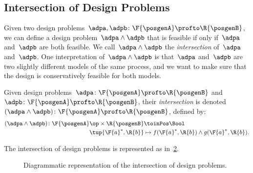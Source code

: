 %


\begin{figure}[h!]
  \centering
  \caption{\label{fig:dpcoproduct}}
\end{figure}

\subsection{Intersection of Design Problems}

Given two design problems~$\adpa, \adpb \colon \F{\posgenA} \profto \R{\posgenB}$, we can define a design problem~$\adpa \wedge \adpb$ that is feasible if only if~$\adpa$ and~$\adpb$ are both feasible.
We call~$\adpa \wedge \adpb$ the \emph{intersection} of~$\adpa$ and~$\adpb$.
One interpretation of~$\adpa \wedge \adpb$ is that~$\adpa$ and~$\adpb$ are two slightly different models of the same process, and we want to make sure that the design is conservatively feasible for both models.

\begin{definition}
  \label{def:intersection_dp}
  \label{def:dp-intersection}
  Given design problems~$\adpa\colon \F{\posgenA} \profto \R{\posgenB}$ and~$\adpb\colon \F{\posgenA} \profto \R{\posgenB}$,
  their \emph{intersection} is denoted~$(\adpa \wedge \adpb)\colon \F{\posgenA} \profto \R{\posgenB}$, defined by:
  \begin{equation}
    \begin{aligned}
    (\adpa \wedge \adpb)
      \colon \F{\posgenA}\op \times \R{\posgenB} & \toinPos \Bool \\
      \tup{\F{a}^*, \R{b}} & \mapsto f(\F{a}^*, \R{b}) \wedge  g(\F{a}^*, \R{b}).
    \end{aligned}
  \end{equation}
\end{definition}
The intersection of design problems is represented as in~\cref{fig:intersectiondp}.

\begin{figure}[h!]
  \begin{center}
  \end{center}
  \caption{Diagrammatic representation of the intersection of design problems. }
  \label{fig:intersectiondp}
\end{figure}


